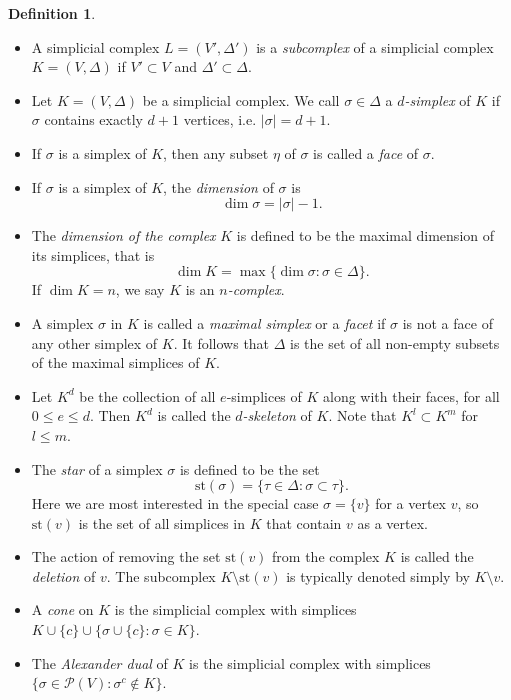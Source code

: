 \documentclass[11pt]{amsart}
\theoremstyle{plain}
\theoremstyle{definition}
\newtheorem{defin}[thm]{Definition}
\theoremstyle{remark}
\begin{document}
\begin{defin}\label{D:SCsStuff}\ 

\begin{itemize}
\item A simplicial complex $L=(V', \Delta')$ is a \emph{subcomplex} of a simplicial complex $K=(V,\Delta)$ if $V'\subset V$ and $\Delta' \subset \Delta$. 
\item Let $K=(V, \Delta)$ be a simplicial complex. We call $\sigma \in \Delta$ a \emph{$d$-simplex} of $K$ if $\sigma$ contains exactly $d+1$ vertices, i.e. $|\sigma|=d+1$.
\item If $\sigma$ is a simplex of $K$, then any subset $\eta$ of $\sigma$ is called a \emph{face} of $\sigma$.
\item If $\sigma$ is a simplex of $K$, the \emph{dimension} of $\sigma$ is $$\dim \sigma=|\sigma|-1.$$
\item The \emph{dimension of the complex} $K$ is defined to be the maximal dimension of its simplices, that is
$$\dim K=\max \{\dim \sigma: \sigma \in \Delta\}.$$
If $\dim K=n$, we say $K$ is an \emph{$n$-complex}.
\item A simplex $\sigma$ in $K$ is called a \emph{maximal simplex} or a \emph{facet} if $\sigma$ is not a face of any other simplex of $K$. It follows that $\Delta$ is the set of all non-empty subsets of the maximal simplices of $K$.
\item Let $K^d$ be the collection of all $e$-simplices of $K$ along with their faces, for all $0 \leq e \leq d$. Then $K^d$ is called the \emph{$d$-skeleton} of $K$. Note that $K^l \subset K^m$ for $l \le m$.
\item The \emph{star} of a simplex $\sigma$ is defined to be the set $$\text{st}(\sigma)=\{\tau \in \Delta: \sigma \subset \tau\}.$$
Here we are most interested in the special case $\sigma=\{v\}$ for a vertex $v$, so $\text{st}(v)$ is the set of all simplices in $K$ that contain $v$ as a vertex.
\item The action of removing the set $\text{st}(v)$ from the complex $K$ is called the \emph{deletion} of $v$. The subcomplex $K\setminus \text{st}(v)$ is typically denoted simply by $K\setminus v$.
\item A \emph{cone} on $K$ is the simplicial complex with simplices $K\cup \{c\} \cup \{\sigma\cup \{c\}\colon \sigma\in K\}$.
\item The \emph{Alexander dual} of $K$ is the simplicial complex with simplices $\{\sigma\in \mathcal P(V)\colon \sigma^c \notin K\}$.
\end{itemize}
\end{defin}
\end{document}
